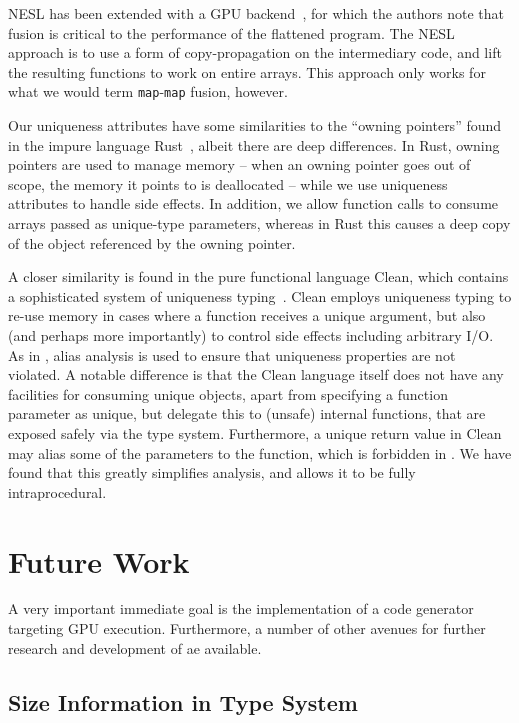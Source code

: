 NESL has been extended with a GPU backend~\cite{bergstrom2012nested},
for which the authors note that fusion is critical to the performance
of the flattened program.  The NESL approach is to use a form of
copy-propagation on the intermediary code, and lift the resulting
functions to work on entire arrays.  This approach only works for what
we would term \texttt{map}-\texttt{map} fusion, however.

Our uniqueness attributes have some similarities to the ``owning
pointers'' found in the impure language Rust~\cite{rust}, albeit there
are deep differences.  In Rust, owning pointers are used to manage
memory -- when an owning pointer goes out of scope, the memory it
points to is deallocated -- while we use uniqueness attributes to
handle side effects.  In addition, we allow function calls to consume
arrays passed as unique-type parameters, whereas in Rust this causes a
deep copy of the object referenced by the owning pointer.

A closer similarity is found in the pure functional language Clean,
which contains a sophisticated system of uniqueness
typing~\cite{barendsen1996uniqueness}.  Clean employs uniqueness
typing to re-use memory in cases where a function receives a unique
argument, but also (and perhaps more importantly) to control side
effects including arbitrary I/O.  As in \LO{}, alias analysis is used
to ensure that uniqueness properties are not violated.  A notable
difference is that the Clean language itself does not have any
facilities for consuming unique objects, apart from specifying a
function parameter as unique, but delegate this to (unsafe) internal
functions, that are exposed safely via the type system.  Furthermore,
a unique return value in Clean may alias some of the parameters to the
function, which is forbidden in \LO{}.  We have found that this
greatly simplifies analysis, and allows it to be fully
intraprocedural.

\section{Future Work}
\label{sec:future-work}

A very important immediate goal is the implementation of a code
generator targeting GPU execution.  Furthermore, a number of other
avenues for further research and development of \LO{} ae available.

\subsection{Size Information in Type System}

